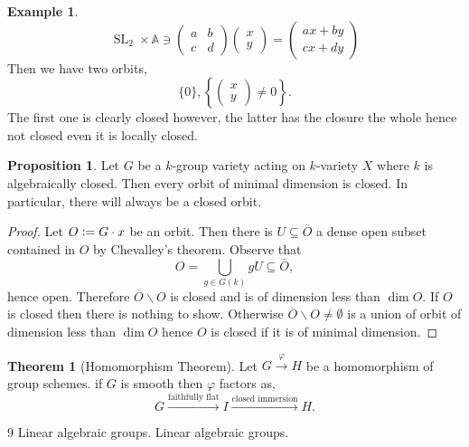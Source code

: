 \documentclass[10pt]{article}
\numberwithin{equation}{section}
\theoremstyle{definition}
\newtheorem{theorem}{Theorem} [section]
\newtheorem{proposition}{Proposition}[section]
\newtheorem{example}{Example}[section]
\DeclareMathOperator{\SL}{SL}
\newcommand{\defeq}{\vcentcolon=}
\newcommand{\A}[0]{\mathbb{A}}
\begin{document}
\begin{example}
    \label{example_30}
    \begin{equation*}
        \SL_2\times\A \ni\begin{pmatrix}
            a & b \\ c & d 
        \end{pmatrix}
        \begin{pmatrix}
            x \\ y 
        \end{pmatrix}
        = \begin{pmatrix}
            ax + by \\ cx+dy
        \end{pmatrix}
    \end{equation*}
    Then we have two orbits,
    \begin{equation*}
        \{0\},\left\{\begin{pmatrix}
            x \\ y
        \end{pmatrix}\not=0\right\}.
    \end{equation*}
    The first one is clearly closed however, the latter has the closure the whole hence not closed even it is locally closed.
\end{example}
\begin{proposition}
    \label{proposition_31}
    Let $G$ be a $k$-group variety acting on $k$-variety $X$ where $k$ is algebraically closed. Then every orbit of minimal dimension is closed. In particular, there will always be a closed orbit.
\end{proposition}
\begin{proof}
    Let $O\defeq G\cdot x$ be an orbit. Then there is $U\subseteq \overline{O}$ a dense open subset contained in $O$ by Chevalley's theorem. Observe that 
    \begin{equation*}
        O = \bigcup_{g\in G(k)}gU \subseteq \overline{O},
    \end{equation*}
    hence open. Therefore $\overline{O}\backslash O$ is closed and is of dimension less than $\dim O$. If $O$ is closed then there is nothing to show.
    Otherwise $\overline{O}\backslash O\not=\emptyset$ is a union of orbit of dimension less than $\dim O$ hence $O$ is closed if it is of minimal dimension.
\end{proof}

\begin{theorem}[Homomorphism Theorem]
    \label{theorem_32}
    Let $G\stackrel{\varphi}{\to}H$ be a homomorphism of group schemes. if $G$ is smooth then $\varphi$ factors as,
    \begin{equation*}
        G\stackrel{\text{faithfully flat}}{\to} I\stackrel{\text{closed immersion}}{\to}H.
    \end{equation*}
\end{theorem}

\begin{thebibliography}{9}
 Linear algebraic groups.
 Linear algebraic groups.
\end{thebibliography}
\end{document}
